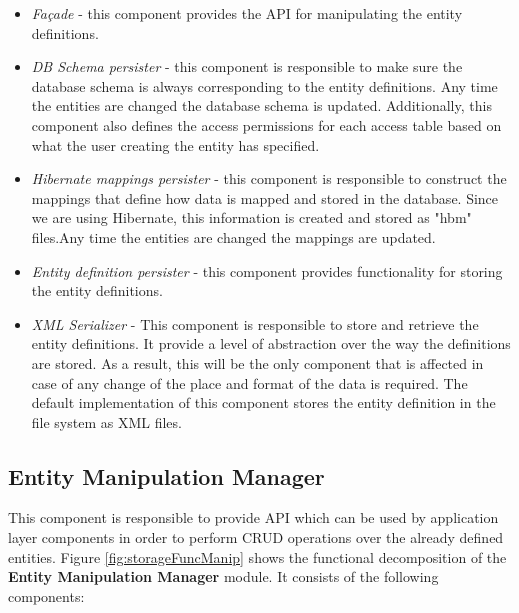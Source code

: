 \begin{itemize}
	\item \textit{Façade} - this component provides the API for manipulating the entity definitions.
	
	\item \textit{DB Schema persister} - this component is responsible to make sure the database schema is always corresponding to the entity definitions. Any time the entities are changed the database schema is updated. Additionally, this component also defines the access permissions for each access table based on what the user creating the entity has specified.
	
	\item \textit{Hibernate mappings persister} - this component is responsible to construct the mappings that define how data is mapped and stored in the database. Since we are using Hibernate, this information is created and stored as "hbm" files.Any time the entities are changed the mappings are updated.
	
	\item \textit{Entity definition persister} - this component provides functionality for storing the entity definitions.
	
	\item \textit{XML Serializer} -  This component is responsible to store and retrieve the entity definitions. It provide a level of abstraction over the way the definitions are stored. As a result, this will be the only component that is affected in case of any change of the place and format of the data is required. The default implementation of this component stores the entity definition in the file system as XML files.
\end{itemize}

\subsection{Entity Manipulation Manager}

This component is responsible to provide API which can be used by application layer components in order to perform CRUD operations over the already defined entities. Figure \ref{fig:storageFuncManip} shows the functional decomposition of the \textbf{Entity Manipulation Manager} module. It consists of the following components:

